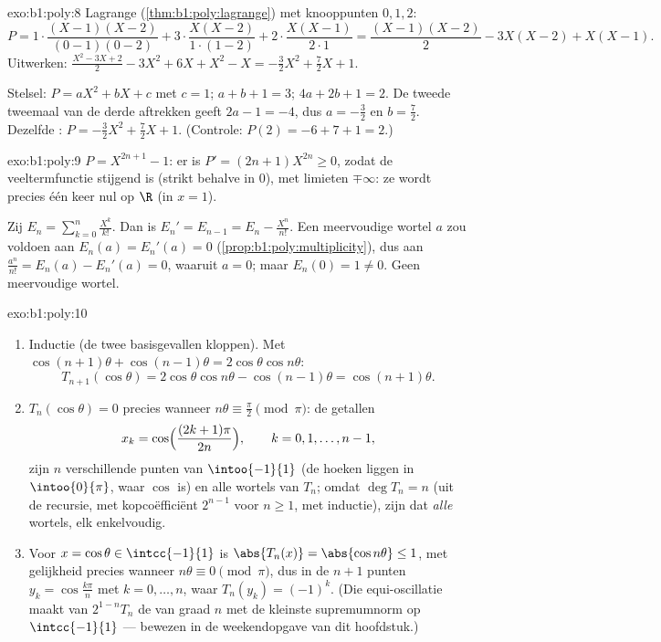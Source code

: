 \begin{solution}{exo:b1:poly:8}
Lagrange (\cref{thm:b1:poly:lagrange}) met knooppunten $0, 1, 2$:
\[
P = 1\cdot\frac{(X-1)(X-2)}{(0-1)(0-2)} + 3\cdot\frac{X(X-2)}{1\cdot(1-2)}
+ 2\cdot\frac{X(X-1)}{2\cdot 1}
= \frac{(X-1)(X-2)}{2} - 3X(X-2) + X(X-1).
\]
Uitwerken: $\frac{X^2 - 3X + 2}{2} - 3X^2 + 6X + X^2 - X =
-\frac{3}{2}X^2 + \frac{7}{2}X + 1$.

Stelsel: $P = aX^2 + bX + c$ met $c = 1$; $a + b + 1 = 3$; $4a + 2b + 1 =
2$. De tweede tweemaal van de derde aftrekken geeft $2a - 1 = -4$, dus $a
= -\frac32$ en $b = \frac72$. Dezelfde : $P = -\frac32 X^2 +
\frac72 X + 1$. (Controle: $P(2) = -6 + 7 + 1 = 2$.)
\end{solution}

\begin{solution}{exo:b1:poly:9}
$P = X^{2n+1} - 1$: er is $P' = (2n+1)X^{2n} \geq 0$, zodat de
veeltermfunctie stijgend is (strikt behalve in $0$), met limieten
$\mp\infty$: ze wordt precies één keer nul op $\R$ (in $x = 1$).

Zij $E_n = \sum_{k=0}^{n} \frac{X^k}{k!}$. Dan is $E_n' = E_{n-1} = E_n -
\frac{X^n}{n!}$. Een meervoudige wortel $a$ zou voldoen aan $E_n(a) =
E_n'(a) = 0$ (\cref{prop:b1:poly:multiplicity}), dus aan
$\frac{a^n}{n!} = E_n(a) - E_n'(a) = 0$, waaruit $a = 0$; maar $E_n(0) =
1 \neq 0$. Geen meervoudige wortel.
\end{solution}

\begin{solution}{exo:b1:poly:10}
\begin{enumerate}
  \item Inductie (de twee basisgevallen kloppen). Met $\cos(n+1)\theta +
        \cos(n-1)\theta = 2\cos\theta\cos n\theta$:
        \[
        T_{n+1}(\cos\theta) = 2\cos\theta \cos n\theta -
        \cos(n-1)\theta = \cos(n+1)\theta .
        \]
  \item $T_n(\cos\theta) = 0$ precies wanneer $n\theta \equiv
        \frac\pi2 \pmod \pi$: de getallen
        \[
        x_k = \cos\Bigl(\frac{(2k+1)\pi}{2n}\Bigr),
        \qquad k = 0, 1, \dots, n-1,
        \]
        zijn $n$ verschillende punten van $\intoo{-1}{1}$ (de hoeken
        liggen in $\intoo{0}{\pi}$, waar $\cos$  is) en alle
        wortels van $T_n$; omdat $\deg T_n = n$ (uit de recursie, met
        kopcoëfficiënt $2^{n-1}$ voor $n \geq 1$, met inductie), zijn
        dat \emph{alle} wortels, elk enkelvoudig.
  \item Voor $x = \cos\theta \in \intcc{-1}{1}$ is $\abs{T_n(x)} =
        \abs{\cos n\theta} \leq 1$, met gelijkheid precies wanneer
        $n\theta \equiv 0 \pmod\pi$, dus in de $n+1$ punten $y_k =
        \cos\frac{k\pi}{n}$ met $k = 0, \dots, n$, waar $T_n(y_k) =
        (-1)^k$. (Die equi-oscillatie maakt van $2^{1-n}T_n$ de  van graad $n$ met de kleinste supremumnorm op
        $\intcc{-1}{1}$ --- bewezen in de weekendopgave van dit
        hoofdstuk.)
\end{enumerate}
\end{solution}


